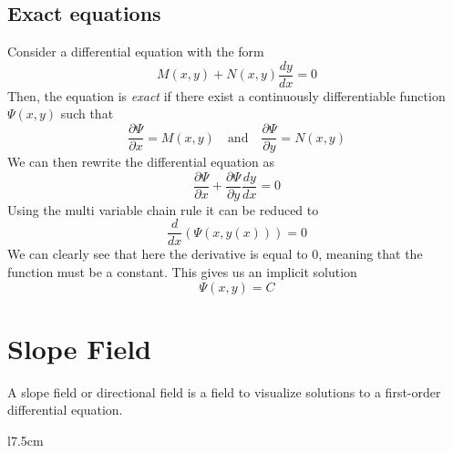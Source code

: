 \documentclass{article}
\begin{document}
\pagebreak

\subsection{Exact equations}

Consider a differential equation with the form
\[
    M(x,y)+N(x,y)\frac{dy}{dx}=0
\]
Then, the equation is \textit{exact} if there exist a continuously
differentiable function \(\Psi(x,y)\) such that
\[
    \frac{\partial \Psi}{\partial x} = M(x,y)
    \quad \text{and} \quad
    \frac{\partial \Psi}{\partial y} = N(x,y)
\]
We can then rewrite the differential equation as
\[
    \frac{\partial \Psi}{\partial x}+\frac{\partial \Psi}{\partial y} \frac{dy}{dx}=0
\]
Using the multi variable chain rule it can be reduced to
\[
    \frac{d}{dx}\left( \Psi(x,y(x)) \right) = 0
\]
We can clearly see that here the derivative is equal to \(0\), meaning that
the function must be a constant. This gives us an implicit solution
\[
    \Psi(x,y)=C
\]


\pagebreak

\section{Slope Field}

A slope field or directional field is a field to visualize
solutions to a first-order differential equation.

\begin{wrapfigure}{l}{7.5cm}
\end{wrapfigure}
\end{document}
